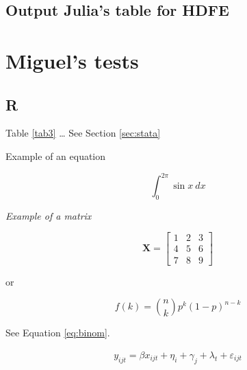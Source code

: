 \documentclass[
  12pt,
]{article}
\begin{document}
\hypertarget{output-julias-table-for-hdfe}{%
\subsection{Output Julia's table for HDFE}\label{output-julias-table-for-hdfe}}

\begin{table}[ht]
\label{tab:hdfe}
  
\end{table}

\hypertarget{miguels-tests}{%
\section{Miguel's tests}\label{miguels-tests}}

\hypertarget{r}{%
\subsection{R}\label{r}}

Table \ref{tab3} \ldots{} See Section \ref{sec:stata}

Example of an equation

\[\int_0^{2\pi} \sin x~dx\]

\emph{Example of a matrix}

\[
\mathbf{X} = \left[\begin{array}
{rrr}
1 & 2 & 3 \\
4 & 5 & 6 \\
7 & 8 & 9
\end{array}\right]
\]

or

\begin{equation}
f\left(k\right)=\binom{n}{k}p^k\left(1-p\right)^{n-k} \label{eq:binom}
\end{equation}

See Equation \eqref{eq:binom}.

\begin{align}
y_{ijt} = \beta x_{ijt} + \eta_i + \gamma_j + \lambda_t + \varepsilon_{ijt}
\end{align}
\end{document}
